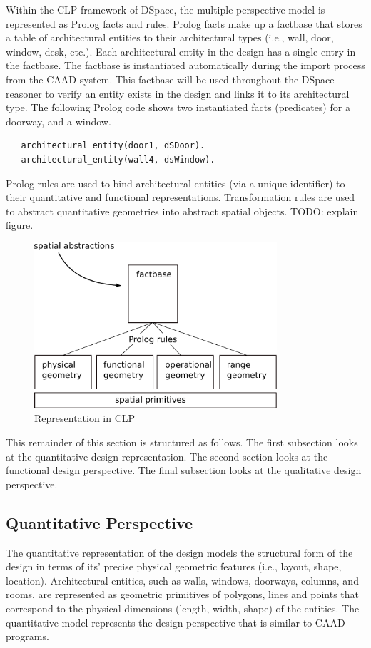 \documentclass[12pt]{ucthesis}
\begin{document}
Within the CLP framework of DSpace, the multiple perspective model is represented as Prolog facts and rules. Prolog facts make up a factbase that stores a table of architectural entities to their architectural types (i.e., wall, door, window, desk, etc.). Each architectural entity in the design has a single entry in the factbase. The factbase is instantiated automatically during the import process from the CAAD system. This factbase will be used throughout the DSpace reasoner to  verify an entity exists in the design and links it to its architectural type. The following Prolog code shows two instantiated facts (predicates) for a doorway, and a window. 
\begin{verbatim}
   architectural_entity(door1, dSDoor).
   architectural_entity(wall4, dsWindow).
\end{verbatim}

Prolog rules are used to bind architectural entities (via a unique identifier) to their quantitative and functional representations. Transformation rules are used to abstract quantitative geometries into abstract spatial objects. TODO: explain figure. 

\begin{figure}[H]
\centering
\includegraphics[width=90mm]{clp-design}
\caption{Representation in CLP}
\label{clp-design}
\end{figure}

This remainder of this section is structured as follows. The first subsection looks at the quantitative design representation. The second section looks at the functional design perspective. The final subsection looks at the qualitative design perspective.


\subsection{Quantitative Perspective}
The quantitative representation of the design models the structural form of the design in terms of its' precise physical geometric features (i.e., layout, shape, location). Architectural entities, such as walls, windows, doorways, columns, and rooms, are represented as geometric primitives of polygons, lines and points that correspond to the physical dimensions (length, width, shape) of the entities. The quantitative model represents the design perspective that is similar to CAAD programs.
\end{document}
